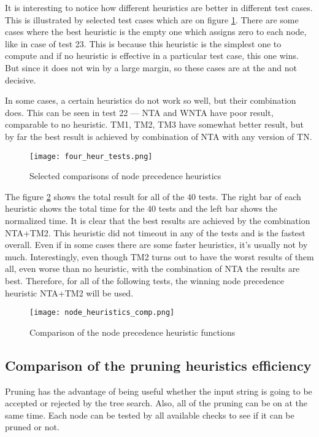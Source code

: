 It is interesting to notice how different heuristics are better in different test cases. This is illustrated by selected test cases which are on figure \ref{fig:selected_tests}. There are some cases where the best heuristic is the empty one which assigns zero to each node, like in case of test 23. This is because this heuristic is the simplest one to compute and if no heuristic is effective in a particular test case, this one wins. But since it does not win by a large margin, so these cases are at the and not decisive.

In some cases, a certain heuristics do not work so well, but their combination does. This can be seen in test 22 --- NTA and WNTA have poor result, comparable to no heuristic. TM1, TM2, TM3 have somewhat better result, but by far the best result is achieved by combination of NTA with any version of TN.

\begin{figure}[h]
  \texttt{[image: four\_heur\_tests.png]}
  \caption{Selected comparisons of node precedence heuristics}
  \label{fig:selected_tests}
\end{figure}

The figure \ref{fig:node_heuristics_comp} shows the total result for all of the 40 tests. The right bar of each heuristic shows the total time for the 40 tests and the left bar shows the normalized time. It is clear that the best results are achieved by the combination NTA+TM2. This heuristic did not timeout in any of the tests and is the fastest overall. Even if in some cases there are some faster heuristics, it's usually not by much. Interestingly, even though TM2 turns out to have the worst results of them all, even worse than no heuristic, with the combination of NTA the results are best. Therefore, for all of the following tests, the winning node precedence heuristic NTA+TM2 will be used.

\begin{figure}[h]
  \texttt{[image: node\_heuristics\_comp.png]}
  \caption{Comparison of the node precedence heuristic functions}
  \label{fig:node_heuristics_comp}
\end{figure}

\subsection{Comparison of the pruning heuristics efficiency}

Pruning has the advantage of being useful whether the input string is going to be accepted or rejected by the tree search. Also, all of the pruning can be on at the same time. Each node can be tested by all available checks to see if it can be pruned or not.

